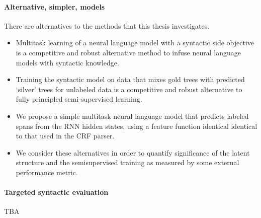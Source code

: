 \paragraph{Alternative, simpler, models} There are alternatives to the methods that this thesis investigates.
\begin{itemize}

  \item Multitask learning of a neural language model with a syntactic side objective is a competitive and robust alternative method to infuse neural language models with syntactic knowledge.

  \item Training the syntactic model on data that mixes gold trees with predicted `silver' trees for unlabeled data is a competitive and robust alternative to fully principled semi-supervised learning.

  \item We propose a simple multitask neural language model that predicts labeled spans from the RNN hidden states, using a feature function identical identical to that used in the CRF parser.

  \item We consider these alternatives in order to quantify significance of the latent structure and the semisupervised training as measured by some external performance metric.
  
\end{itemize}

\paragraph{Targeted syntactic evaluation}
TBA
